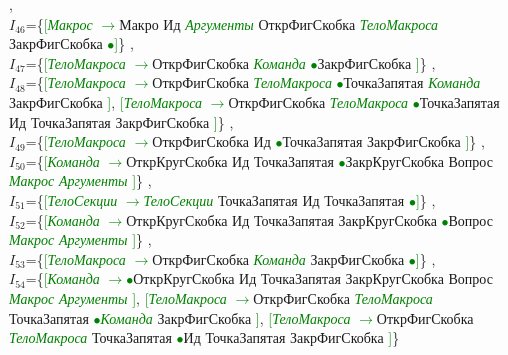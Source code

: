 \documentclass[a0]{a0poster}
\begin{document}
,\\
$I_{46}$=\{\textcolor{Green}{[}\textcolor{Green}{\textit{Макрос}} \textcolor{Green}{$\to$}Макро Ид \textcolor{Green}{\textit{Аргументы}} ОткрФигСкобка \textcolor{Green}{\textit{ТелоМакроса}} ЗакрФигСкобка \textcolor{Green}{$\bullet$}\textcolor{Green}{]}\}
,\\
$I_{47}$=\{\textcolor{Green}{[}\textcolor{Green}{\textit{ТелоМакроса}} \textcolor{Green}{$\to$}ОткрФигСкобка \textcolor{Green}{\textit{Команда}} \textcolor{Green}{$\bullet$}ЗакрФигСкобка \textcolor{Green}{]}\}
,\\
$I_{48}$=\{\textcolor{Green}{[}\textcolor{Green}{\textit{ТелоМакроса}} \textcolor{Green}{$\to$}ОткрФигСкобка \textcolor{Green}{\textit{ТелоМакроса}} \textcolor{Green}{$\bullet$}ТочкаЗапятая \textcolor{Green}{\textit{Команда}} ЗакрФигСкобка \textcolor{Green}{]}, \textcolor{Green}{[}\textcolor{Green}{\textit{ТелоМакроса}} \textcolor{Green}{$\to$}ОткрФигСкобка \textcolor{Green}{\textit{ТелоМакроса}} \textcolor{Green}{$\bullet$}ТочкаЗапятая Ид ТочкаЗапятая ЗакрФигСкобка \textcolor{Green}{]}\}
,\\
$I_{49}$=\{\textcolor{Green}{[}\textcolor{Green}{\textit{ТелоМакроса}} \textcolor{Green}{$\to$}ОткрФигСкобка Ид \textcolor{Green}{$\bullet$}ТочкаЗапятая ЗакрФигСкобка \textcolor{Green}{]}\}
,\\
$I_{50}$=\{\textcolor{Green}{[}\textcolor{Green}{\textit{Команда}} \textcolor{Green}{$\to$}ОткрКругСкобка Ид ТочкаЗапятая \textcolor{Green}{$\bullet$}ЗакрКругСкобка Вопрос \textcolor{Green}{\textit{Макрос}} \textcolor{Green}{\textit{Аргументы}} \textcolor{Green}{]}\}
,\\
$I_{51}$=\{\textcolor{Green}{[}\textcolor{Green}{\textit{ТелоСекции}} \textcolor{Green}{$\to$}\textcolor{Green}{\textit{ТелоСекции}} ТочкаЗапятая Ид ТочкаЗапятая \textcolor{Green}{$\bullet$}\textcolor{Green}{]}\}
,\\
$I_{52}$=\{\textcolor{Green}{[}\textcolor{Green}{\textit{Команда}} \textcolor{Green}{$\to$}ОткрКругСкобка Ид ТочкаЗапятая ЗакрКругСкобка \textcolor{Green}{$\bullet$}Вопрос \textcolor{Green}{\textit{Макрос}} \textcolor{Green}{\textit{Аргументы}} \textcolor{Green}{]}\}
,\\
$I_{53}$=\{\textcolor{Green}{[}\textcolor{Green}{\textit{ТелоМакроса}} \textcolor{Green}{$\to$}ОткрФигСкобка \textcolor{Green}{\textit{Команда}} ЗакрФигСкобка \textcolor{Green}{$\bullet$}\textcolor{Green}{]}\}
,\\
$I_{54}$=\{\textcolor{Green}{[}\textcolor{Green}{\textit{Команда}} \textcolor{Green}{$\to$}\textcolor{Green}{$\bullet$}ОткрКругСкобка Ид ТочкаЗапятая ЗакрКругСкобка Вопрос \textcolor{Green}{\textit{Макрос}} \textcolor{Green}{\textit{Аргументы}} \textcolor{Green}{]}, \textcolor{Green}{[}\textcolor{Green}{\textit{ТелоМакроса}} \textcolor{Green}{$\to$}ОткрФигСкобка \textcolor{Green}{\textit{ТелоМакроса}} ТочкаЗапятая \textcolor{Green}{$\bullet$}\textcolor{Green}{\textit{Команда}} ЗакрФигСкобка \textcolor{Green}{]}, \textcolor{Green}{[}\textcolor{Green}{\textit{ТелоМакроса}} \textcolor{Green}{$\to$}ОткрФигСкобка \textcolor{Green}{\textit{ТелоМакроса}} ТочкаЗапятая \textcolor{Green}{$\bullet$}Ид ТочкаЗапятая ЗакрФигСкобка \textcolor{Green}{]}\}
\end{document}
